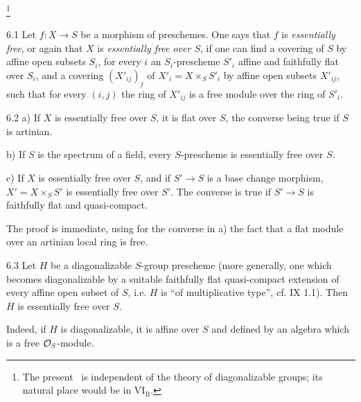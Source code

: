 \footnote{The present \No\ is independent of the theory of diagonalizable groups; its natural place would be in VI$_{\mathrm B}$.}
\begin{definition}{6.1}\label{VIII.6.1}
Let $f:X\to S$ be a morphism of preschemes. One says that $f$ is \emph{essentially free}, or again that $X$ is \emph{essentially free over $S$}, if one can find a covering of $S$ by affine open subsets $S_i$, for every $i$ an $S_i$-prescheme $S'_i$ affine and faithfully flat over $S_i$, and a covering $(X'_{ij})_j$ of $X'_i=X\times_S S'_i$ by affine open subsets $X'_{ij}$, such that for every $(i,j)$ the ring of $X'_{ij}$ is a free module over the ring of $S'_i$.
\end{definition}
\begin{proposition}{6.2}\label{VIII.6.2}
a) If $X$ is essentially free over $S$, it is flat over $S$, the converse being true if $S$ is artinian.

b) If $S$ is the spectrum of a field, every $S$-prescheme is essentially free over $S$.

c) If $X$ is essentially free over $S$, and if $S'\to S$ is a base change morphism, $X'=X\times_S S'$ is essentially free over $S'$. The converse is true if $S'\to S$ is faithfully flat and quasi-compact.
\end{proposition}
The proof is immediate, using for the converse in a) the fact that a flat module over an artinian local ring is free.
\begin{proposition}{6.3}\label{VIII.6.3}
Let $H$ be a diagonalizable $S$-group prescheme (more generally, one which becomes diagonalizable by a suitable faithfully flat quasi-compact extension of every affine open subset of $S$, i.e. $H$ is ``of multiplicative type'', cf. IX 1.1). Then $H$ is essentially free over $S$.
\end{proposition}
Indeed, if $H$ is diagonalizable, it is affine over $S$ and defined by an algebra which is a free $\mathcal{O}_S$-module.

